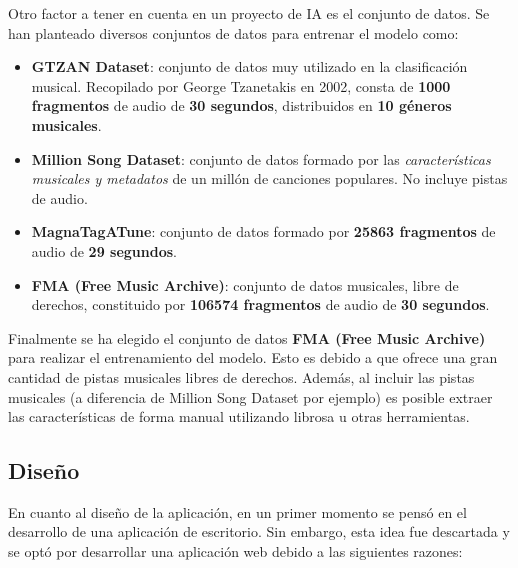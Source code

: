 Otro factor a tener en cuenta en un proyecto de IA es el conjunto de datos. Se han planteado diversos conjuntos de datos para entrenar el modelo como:
\begin{itemize}

\item \textbf{GTZAN Dataset}: conjunto de datos muy utilizado en la clasificación musical. Recopilado por George Tzanetakis en 2002, consta de \textbf{1000 fragmentos} de audio de \textbf{30 segundos}, distribuidos en \textbf{10 géneros musicales}.

\item \textbf{Million Song Dataset}: conjunto de datos formado por las \textit{características musicales y metadatos} de un millón de canciones populares. No incluye pistas de audio.

\item \textbf{MagnaTagATune}: conjunto de datos formado por \textbf{25863 fragmentos} de audio de \textbf{29 segundos}.

\item \textbf{FMA (Free Music Archive)}: conjunto de datos musicales, libre de derechos, constituido por \textbf{106574 fragmentos} de audio de \textbf{30 segundos}. 

\end{itemize}

Finalmente se ha elegido el conjunto de datos \textbf{FMA (Free Music Archive)} para realizar el entrenamiento del modelo. Esto es debido a que ofrece una gran cantidad de pistas musicales libres de derechos. Además, al incluir las pistas musicales (a diferencia de Million Song Dataset por ejemplo)
es posible extraer las características de forma manual utilizando librosa u otras herramientas.

\subsection{Diseño}

En cuanto al diseño de la aplicación, en un primer momento se pensó en el desarrollo de una aplicación de escritorio. Sin embargo, esta idea fue descartada y se optó por desarrollar una aplicación web debido a las siguientes razones:

